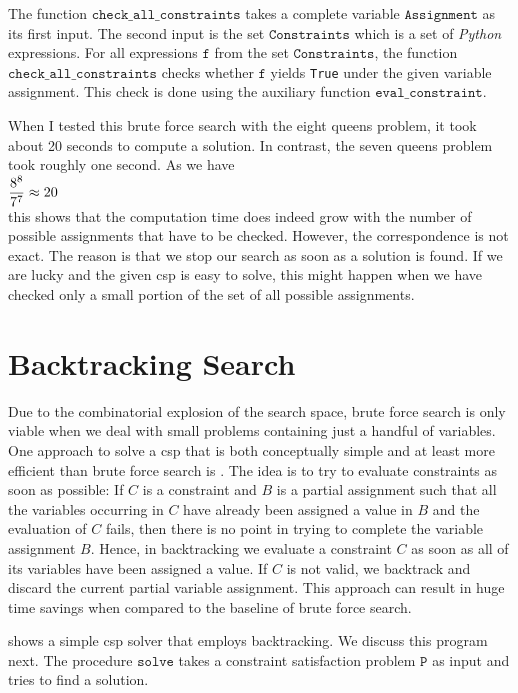 The function $\texttt{check\_all\_constraints}$ takes a complete variable $\texttt{Assignment}$ as
its first input.  The second input is the set $\texttt{Constraints}$ which is a set of \textsl{Python}
expressions.  For all expressions
$\texttt{f}$ from the set $\texttt{Constraints}$, the function $\texttt{check\_all\_constraints}$ checks
whether $\texttt{f}$ yields \texttt{True} under the given variable assignment.
This check is done using the auxiliary function $\texttt{eval\_constraint}$.  

When I tested this brute force search with the eight queens problem, it took about 20 seconds to
compute a solution.  In contrast, the seven queens problem took roughly one second.  As we have
\\[0.2cm]
\hspace*{1.3cm}
$\displaystyle\frac{8^8}{7^7} \approx 20$ 
\\[0.2cm]
this shows that the computation time does indeed grow with the number of possible assignments that
have to be checked.  However, the correspondence is not exact.  The reason is that we stop our
search as soon as a solution is found.  If we are lucky and the given \ac{csp} is easy to solve, this
might happen when we have checked only a small portion of the set of all possible assignments.

\section{Backtracking Search}
Due to the combinatorial explosion of the search space, brute force search is only viable when we deal with
small problems containing just a handful of variables.  One approach to solve a \ac{csp} that is both
conceptually simple and at least more efficient than brute force search is .  The idea is to
try to evaluate constraints as soon as possible:  If $C$ is a constraint and $B$ is a partial assignment such
that all the variables occurring in $C$ have already been assigned a value in $B$ and the evaluation of $C$
fails, then there is no point in trying to complete the variable assignment $B$.  Hence, in backtracking we
evaluate a constraint $C$ as soon as all of its variables have been assigned a value.  If $C$ is not valid, we
backtrack and discard the current partial variable assignment.  This approach can result in huge time savings
when compared to the baseline of brute force search.

 shows a simple \ac{csp} solver 
that employs backtracking.  
We discuss this program next.  The procedure $\texttt{solve}$ takes a constraint
satisfaction problem $\mathtt{P}$ as input and tries to find a solution.  


